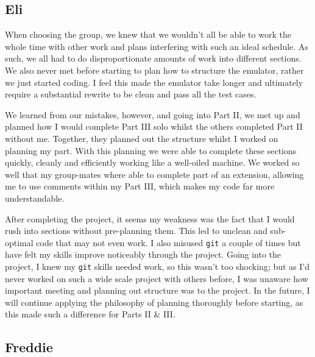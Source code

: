 \documentclass[11pt]{article}
\begin{document}
\subsection{Eli}

When choosing the group, we knew that we wouldn't all be able to work the whole time with 
other work and plans interfering with such an ideal schedule. As such, we all had to do 
disproportionate amounts of work into different sections. We also never met before starting to 
plan how to structure the  emulator, rather we just started coding. I feel this made the 
emulator take longer and ultimately require a substantial rewrite to be clean and pass all the 
test cases.

We learned from our mistakes, however, and going into Part II, we met up and planned how I 
would complete Part III solo whilst the others completed Part II without me. Together, they 
planned out the structure whilst I worked on planning my part. With this planning we were 
able to complete these sections quickly, cleanly and efficiently working like a well-oiled 
machine. We worked so well that my group-mates where able to complete part of an extension, 
allowing me to use comments within my Part III, which makes my code far more understandable.

After completing the project, it seems my weakness was the fact that I would rush into 
sections without pre-planning them. This led to unclean and sub-optimal code that may not 
even work. I also misused \verb|git| a couple of times but have felt my skills improve 
noticeably through the project. Going into the project, I knew my \verb|git| skills needed 
work, so this wasn't too shocking; but as I'd never worked on such a wide scale project with 
others before, I was unaware how important meeting and planning out structure was to the 
project. In the future, I will continue applying the philosophy of planning thoroughly before 
starting, as this made such a difference for Parts II \& III.

\subsection{Freddie}
\end{document}
